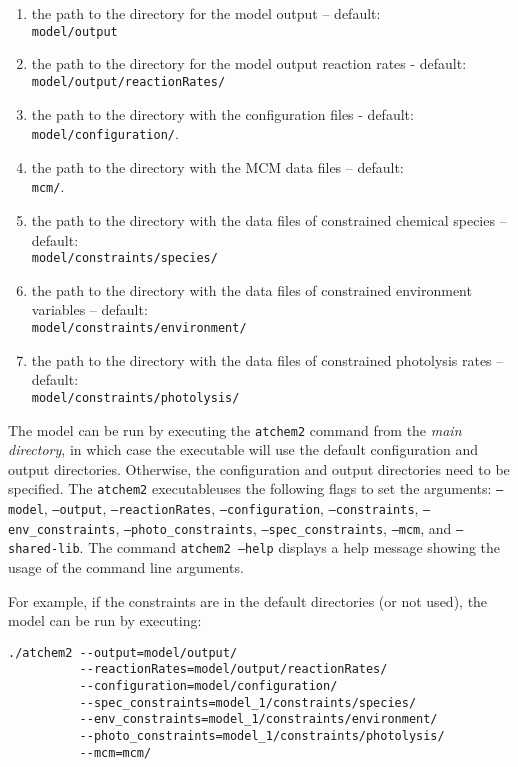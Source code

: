 \begin{enumerate}
\item the path to the directory for the model output -- default:\\
  \texttt{model/output}
\item the path to the directory for the model output reaction rates -
  default:\\ \texttt{model/output/reactionRates/}
\item the path to the directory with the configuration files -
  default:\\ \texttt{model/configuration/}.
\item the path to the directory with the MCM data files -- default:\\
  \texttt{mcm/}.
\item the path to the directory with the data files of constrained
  chemical species -- default:\\ \texttt{model/constraints/species/}
\item the path to the directory with the data files of constrained
  environment variables -- default:\\
  \texttt{model/constraints/environment/}
\item the path to the directory with the data files of constrained
  photolysis rates -- default:\\
  \texttt{model/constraints/photolysis/}
\end{enumerate}

The model can be run by executing the \texttt{atchem2} command from
the \emph{main directory}, in which case the executable will use the
default configuration and output directories. Otherwise, the
configuration and output directories need to be specified. The
\texttt{atchem2} executableuses the following flags to set the
arguments: \texttt{--model}, \texttt{--output},
\texttt{--reactionRates}, \texttt{--configuration},
\texttt{--constraints}, \texttt{--env\_constraints},
\texttt{--photo\_constraints}, \texttt{--spec\_constraints},
\texttt{--mcm}, and \texttt{--shared-lib}. The command \texttt{atchem2
  --help} displays a help message showing the usage of the command
line arguments.

For example, if the constraints are in the default directories (or not
used), the model can be run by executing:

\begin{verbatim}
./atchem2 --output=model/output/
          --reactionRates=model/output/reactionRates/
          --configuration=model/configuration/
          --spec_constraints=model_1/constraints/species/
          --env_constraints=model_1/constraints/environment/
          --photo_constraints=model_1/constraints/photolysis/
          --mcm=mcm/
\end{verbatim}

